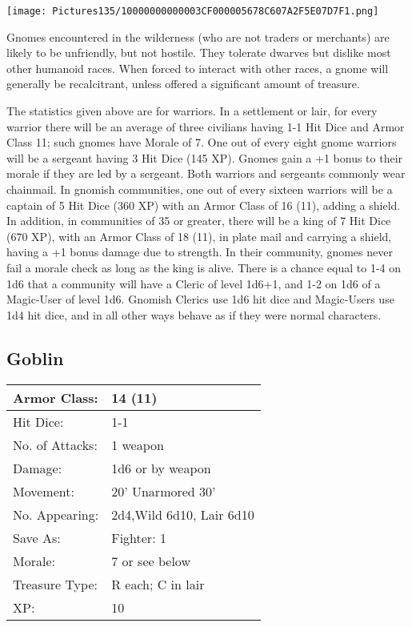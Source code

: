 \documentclass[a4paper,twoside,openany,10pt]{book}
\begin{document}
\begin{multicols}{2}
\begin{center}
	\texttt{[image: Pictures135/10000000000003CF000005678C607A2F5E07D7F1.png]}
\end{center}

Gnomes encountered in the wilderness (who are not traders or merchants) are likely to be unfriendly, but not hostile. They tolerate dwarves but dislike most other humanoid races. When forced to interact with other races, a gnome will generally be recalcitrant, unless offered a significant amount of treasure.

The statistics given above are for warriors. In a settlement or lair, for every warrior there will be an average of three civilians having 1-1 Hit Dice and Armor Class 11; such gnomes have Morale of 7. One out of every eight gnome warriors will be a sergeant having 3 Hit Dice (145 XP). Gnomes gain a +1 bonus to their morale if they are led by a sergeant. Both warriors and sergeants commonly wear chainmail. In gnomish communities, one out of every sixteen warriors will be a captain of 5 Hit Dice (360 XP) with an Armor Class of 16 (11), adding a shield. In addition, in communities of 35 or greater, there will be a king of 7 Hit Dice (670 XP), with an Armor Class of 18 (11), in plate mail and carrying a shield, having a +1 bonus damage due to strength. In their community, gnomes never fail a morale check as long as the king is alive. There is a chance equal to 1-4 on 1d6 that a community will have a Cleric of level 1d6+1, and 1-2 on 1d6 of a Magic-User of level 1d6. Gnomish Clerics use 1d6 hit dice and Magic-Users use 1d4 hit dice, and in all other ways behave as if they were normal characters.

\subsection*{Goblin}\label{goblin}

\begin{tabularx}{0.48\textwidth}{@{}lX@{}}
Armor Class: & 14 (11) \\\hline
Hit Dice: & 1-1 \\\hline
No. of Attacks: & 1 weapon \\\hline
Damage: & 1d6 or by weapon \\\hline
Movement: & 20' Unarmored 30' \\\hline
No. Appearing: & 2d4,Wild 6d10, Lair 6d10 \\\hline
Save As: & Fighter: 1 \\\hline
Morale: & 7 or see below \\\hline
Treasure Type: & R each; C in lair \\\hline
XP: & 10 \\\hline
\end{tabularx}\medskip



\end{multicols}
\end{document}
